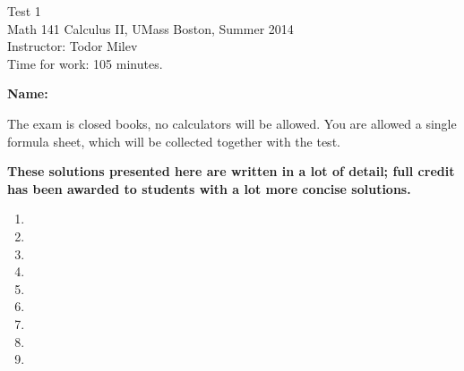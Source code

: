 \documentclass{article}
\begin{document}
\begin{center}
\Large
Test 1\\\normalsize Math 141 Calculus II, UMass Boston, Summer 2014 \\  Instructor: Todor Milev\\ Time for work: 105 minutes.
\end{center}


\noindent \textbf{Name:} \hfill{~}

\noindent The exam is closed books, no calculators will be allowed. You are allowed a single formula sheet, which will be collected together with the test.

\textbf{These solutions presented here are written in a lot of detail; full credit has been awarded to students with a lot more concise solutions.}

\begin{enumerate}
\item 
\item 

\item

\item


\item


\item

\item


\item 

\item







\end{enumerate}
\end{document}
